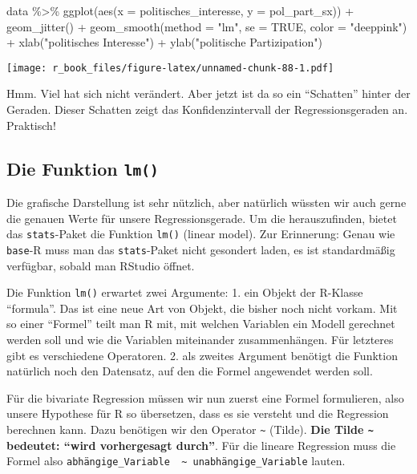 \documentclass[
]{book}
\newenvironment{Shaded}{\begin{snugshade}}{\end{snugshade}}
\newcommand{\AttributeTok}[1]{\textcolor[rgb]{0.77,0.63,0.00}{#1}}
\newcommand{\ConstantTok}[1]{\textcolor[rgb]{0.00,0.00,0.00}{#1}}
\newcommand{\FunctionTok}[1]{\textcolor[rgb]{0.00,0.00,0.00}{#1}}
\newcommand{\NormalTok}[1]{#1}
\newcommand{\SpecialCharTok}[1]{\textcolor[rgb]{0.00,0.00,0.00}{#1}}
\newcommand{\StringTok}[1]{\textcolor[rgb]{0.31,0.60,0.02}{#1}}
\begin{document}
\begin{Shaded}
\begin{Highlighting}[]
\NormalTok{data }\SpecialCharTok{\%\textgreater{}\%} 
  \FunctionTok{ggplot}\NormalTok{(}\FunctionTok{aes}\NormalTok{(}\AttributeTok{x =}\NormalTok{ politisches\_interesse, }\AttributeTok{y =}\NormalTok{ pol\_part\_sx)) }\SpecialCharTok{+}
  \FunctionTok{geom\_jitter}\NormalTok{() }\SpecialCharTok{+}
  \FunctionTok{geom\_smooth}\NormalTok{(}\AttributeTok{method =} \StringTok{"lm"}\NormalTok{, }\AttributeTok{se =} \ConstantTok{TRUE}\NormalTok{, }\AttributeTok{color =} \StringTok{"deeppink"}\NormalTok{) }\SpecialCharTok{+}
  \FunctionTok{xlab}\NormalTok{(}\StringTok{"politisches Interesse"}\NormalTok{) }\SpecialCharTok{+}
  \FunctionTok{ylab}\NormalTok{(}\StringTok{"politische Partizipation"}\NormalTok{)}
\end{Highlighting}
\end{Shaded}

\texttt{[image: r\_book\_files/figure-latex/unnamed-chunk-88-1.pdf]}

Hmm. Viel hat sich nicht verändert. Aber jetzt ist da so ein ``Schatten'' hinter der Geraden. Dieser Schatten zeigt das Konfidenzintervall der Regressionsgeraden an. Praktisch!

\hypertarget{die-funktion-lm}{%
\subsection{\texorpdfstring{Die Funktion \texttt{lm()}}{Die Funktion lm()}}\label{die-funktion-lm}}

Die grafische Darstellung ist sehr nützlich, aber natürlich wüssten wir auch gerne die genauen Werte für unsere Regressionsgerade. Um die herauszufinden, bietet das \texttt{stats}-Paket die Funktion \texttt{lm()} (linear model). Zur Erinnerung: Genau wie \texttt{base}-R muss man das \texttt{stats}-Paket nicht gesondert laden, es ist standardmäßig verfügbar, sobald man RStudio öffnet.

Die Funktion \texttt{lm()} erwartet zwei Argumente: 1. ein Objekt der R-Klasse ``formula''. Das ist eine neue Art von Objekt, die bisher noch nicht vorkam. Mit so einer ``Formel'' teilt man R mit, mit welchen Variablen ein Modell gerechnet werden soll und wie die Variablen miteinander zusammenhängen. Für letzteres gibt es verschiedene Operatoren. 2. als zweites Argument benötigt die Funktion natürlich noch den Datensatz, auf den die Formel angewendet werden soll.

Für die bivariate Regression müssen wir nun zuerst eine Formel formulieren, also unsere Hypothese für R so übersetzen, dass es sie versteht und die Regression berechnen kann. Dazu benötigen wir den Operator \texttt{\textasciitilde{}} (Tilde). \textbf{Die Tilde \texttt{\textasciitilde{}} bedeutet: ``wird vorhergesagt durch''}. Für die lineare Regression muss die Formel also \texttt{abhängige\_Variable\ \ \textasciitilde{}\ unabhängige\_Variable} lauten.
\end{document}
